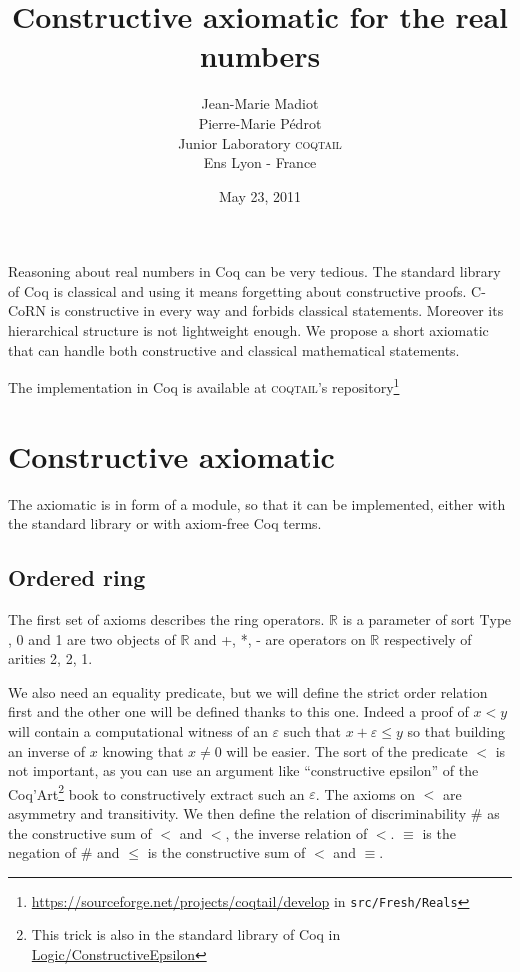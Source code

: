 \documentclass[a4paper,11pt]{article}
\newcommand{\R}{\mathbb{R}}
\newcommand{\Type}{\mbox{Type}}
\newcommand{\coqtail}{\textsc{coqtail}}
\theoremstyle{definition}
\theoremstyle{remark}
\begin{document}
\title{Constructive axiomatic for the real numbers}
\author{Jean-Marie Madiot \\ Pierre-Marie Pédrot \\ Junior Laboratory \coqtail{}\\ Ens Lyon - France\\}
\date{May 23, 2011}

\maketitle 

  Reasoning about real numbers in Coq can be very tedious. The standard library of Coq is classical and using it means forgetting about constructive proofs. C-CoRN is constructive in every way and forbids classical statements. Moreover its hierarchical structure is not lightweight enough. We propose a short axiomatic that can handle both constructive and classical mathematical statements.

  The implementation in Coq is available at \coqtail's repository\footnote{\url{https://sourceforge.net/projects/coqtail/develop} in {\tt src/Fresh/Reals}}

\section{Constructive axiomatic}

  The axiomatic is in form of a module, so that it can be implemented, either with the standard library or with axiom-free Coq terms.

\subsection{Ordered ring}

  The first set of axioms describes the ring operators. $\R$ is a parameter of sort $\Type$, 0 and 1 are two objects of $\R$ and +, *, - are operators on $\R$ respectively of arities 2, 2, 1.

  We also need an equality predicate, but we will define the strict order relation first and the other one will be defined thanks to this one. Indeed a proof of $x<y$ will contain a computational witness of an $\varepsilon$ such that $x+\varepsilon≤y$ so that building an inverse of $x$ knowing that $x\neq 0$ will be easier. The sort of the predicate $<$ is not important, as you can use an argument like ``constructive epsilon'' of the Coq'Art\cite{coqart}\footnote{This trick is also in the standard library of Coq in \href{http://coq.inria.fr/stdlib/Coq.Logic.ConstructiveEpsilon.html}{Logic/ConstructiveEpsilon}} book to constructively extract such an $\varepsilon$. The axioms on $<$ are asymmetry and transitivity. We then define the relation of discriminability $\#$ as the constructive sum of $<$ and $<$, the inverse relation of $<$. $≡$ is the negation of $\#$ and $≤$ is the constructive sum of $<$ and $≡$.
\end{document}
